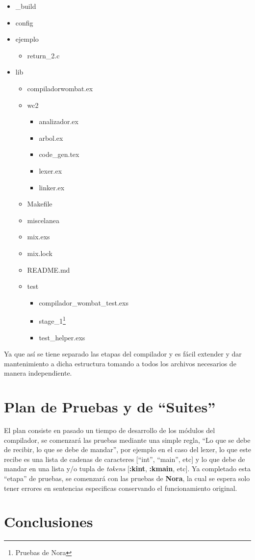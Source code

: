 \documentclass{article}
\begin{document}
\begin{itemize}
\item \_build
\item config
\item ejemplo
  \begin{itemize}
  \item return\_2.c
  \end{itemize}
\item lib
  \begin{itemize}
  \item compiladorwombat.ex
  \item wc2
    \begin{itemize}
    \item analizador.ex
    \item arbol.ex
    \item code\_gen.tex
    \item lexer.ex
    \item linker.ex
    \end{itemize}
  \item Makefile
  \item miscelanea
  \item mix.exs
  \item mix.lock
  \item README.md
  \item test
    \begin{itemize}
    \item compilador\_wombat\_test.exs
    \item stage\_1\footnote{Pruebas de Nora}
    \item test\_helper.exs
    \end{itemize}

  \end{itemize}

\end{itemize}

Ya que así se tiene separado las etapas del compilador y es fácil extender y dar mantenimiento a dicha
estructura tomando a todos los archivos necesarios de manera independiente.

\section{Plan de Pruebas y de ``Suites''}

El plan consiste en pasado un tiempo de desarrollo de los módulos del
compilador, se comenzará las pruebas mediante una  simple regla, ``Lo
que se debe de recibir, lo que se debe de mandar'', por ejemplo en el
caso del lexer, lo que este recibe es una lista de cadenas de caracteres
[``int'', ``main'', etc] y lo que debe de mandar en una lista y/o tupla de
\textit{tokens} [\textbf{:kint}, \textbf{:kmain}, etc]. Ya completado esta ``etapa''
de pruebas, se comenzará con las pruebas de \textbf{Nora}, la cual se espera solo
tener errores en sentencias especificas conservando el funcionamiento original.

\section{Conclusiones}
\end{document}
